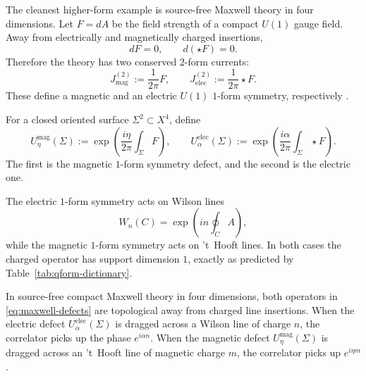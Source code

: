 The cleanest higher-form example is source-free Maxwell theory in four dimensions. Let $F=dA$ be the field strength of a compact $U(1)$ gauge field. Away from electrically and magnetically charged insertions,
\begin{equation}\label{eq:maxwell-closed}
dF=0,
\qquad
d(\star F)=0.
\end{equation}
Therefore the theory has two conserved $2$-form currents:
\begin{equation}\label{eq:maxwell-currents}
J_{\mathrm{mag}}^{(2)}:=\frac{1}{2\pi}F,
\qquad
J_{\mathrm{elec}}^{(2)}:=\frac{1}{2\pi}\star F.
\end{equation}
These define a magnetic and an electric $U(1)$ $1$-form symmetry, respectively \cite{GKSW2015,Bhardwaj2023Lectures}.

\begin{definition}\label{def:maxwell-one-form}
For a closed oriented surface $\Sigma^2\subset X^4$, define
\begin{equation}\label{eq:maxwell-defects}
U^{\mathrm{mag}}_{\eta}(\Sigma)
:=
\exp\!\left(\frac{i\eta}{2\pi}\int_\Sigma F\right),
\qquad
U^{\mathrm{elec}}_{\alpha}(\Sigma)
:=
\exp\!\left(\frac{i\alpha}{2\pi}\int_\Sigma \star F\right).
\end{equation}
The first is the magnetic $1$-form symmetry defect, and the second is the electric one.
\end{definition}

\begin{remark}\label{rem:maxwell-acts-on-lines}
The electric $1$-form symmetry acts on Wilson lines
\begin{equation*}
W_n(C)=\exp\!\left(i n\oint_C A\right),
\end{equation*}
while the magnetic $1$-form symmetry acts on 't~Hooft lines. In both cases the charged operator has support dimension $1$, exactly as predicted by Table~\ref{tab:qform-dictionary}.
\end{remark}

\begin{proposition}\label{prop:maxwell-one-form}
In source-free compact Maxwell theory in four dimensions, both operators in \eqref{eq:maxwell-defects} are topological away from charged line insertions. When the electric defect $U^{\mathrm{elec}}_{\alpha}(\Sigma)$ is dragged across a Wilson line of charge $n$, the correlator picks up the phase $e^{i\alpha n}$. When the magnetic defect $U^{\mathrm{mag}}_{\eta}(\Sigma)$ is dragged across an 't~Hooft line of magnetic charge $m$, the correlator picks up $e^{i\eta m}$.
\end{proposition}

